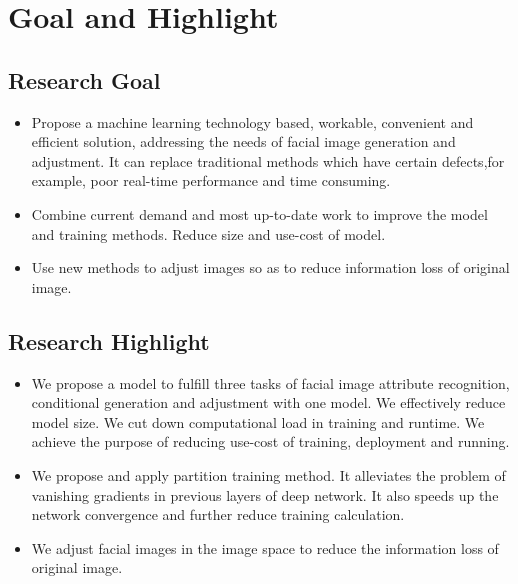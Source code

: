 \section{Goal and Highlight}

\subsection{Research Goal}
\begin{itemize}
\item Propose a machine learning technology based, workable, convenient and efficient solution,
    addressing the needs of facial image generation and adjustment.
    It can replace traditional methods which have certain defects,for example, poor real-time performance and time consuming.
\item Combine current demand and most up-to-date work to improve the model and training methods.
 Reduce size and use-cost of model.
\item Use new methods to adjust images so as to reduce information loss of original image.
\end{itemize}
\subsection{Research Highlight}
\begin{itemize}
\item We propose a model to fulfill three tasks of facial image attribute recognition,
    conditional generation and adjustment with one model.
    We effectively reduce model size.
    We cut down computational load in training and runtime.
    We achieve the purpose of reducing use-cost of training, deployment and running.
\item We propose and apply partition training method.
    It alleviates the problem of vanishing gradients in previous layers of deep network.
    It also speeds up the network convergence and further reduce training calculation.

\item We adjust facial images in the image space to reduce the information loss of original image.
\end{itemize}